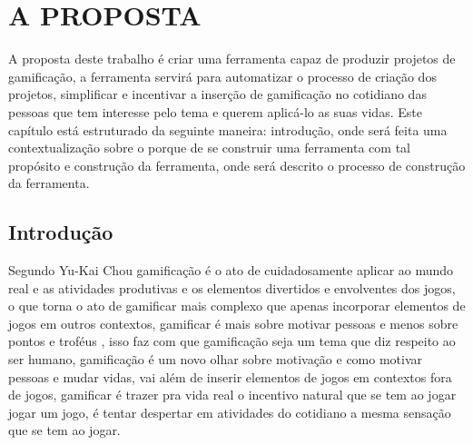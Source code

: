 
\chapter[A Proposta]{A PROPOSTA}

A proposta deste trabalho é criar uma ferramenta capaz de produzir projetos de gamificação, a ferramenta servirá para automatizar o processo de criação dos projetos, simplificar e incentivar a inserção de gamificação no cotidiano das pessoas que tem interesse pelo tema e querem aplicá-lo as suas vidas. Este capítulo está estruturado da seguinte maneira: introdução, onde será feita uma contextualização sobre o porque de se construir uma ferramenta com tal propósito e construção da ferramenta, onde será descrito o processo de construção da ferramenta.           

\section{Introdução}

 

Segundo Yu-Kai Chou \cite{chou2015actionable} gamificação é o ato de cuidadosamente aplicar ao mundo real e as atividades produtivas e os elementos divertidos e envolventes dos jogos, o que torna o ato de gamificar mais complexo que apenas incorporar elementos de jogos em outros contextos, gamificar é mais sobre  motivar pessoas e menos sobre pontos e troféus , isso faz com que gamificação seja um tema que diz respeito ao ser humano, gamificação é um novo olhar sobre motivação e como motivar pessoas e mudar vidas, vai além de inserir elementos de jogos em contextos fora de jogos, gamificar é trazer pra vida real o incentivo natural que se tem ao jogar jogar um jogo, é tentar despertar em atividades do cotidiano a mesma sensação que se tem ao jogar.

